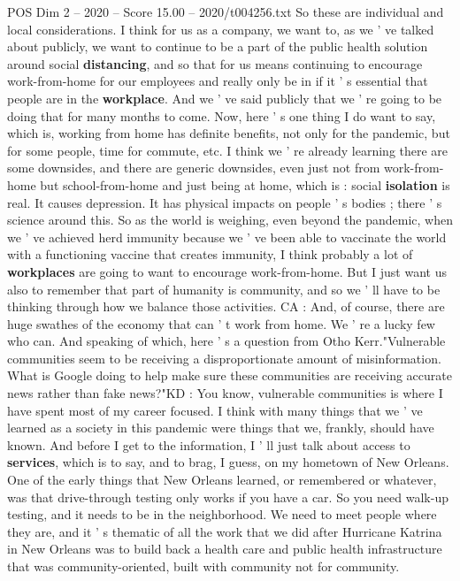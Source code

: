 \begin{textsample}{POS Dim 2 – 2020 – Score 15.00 – 2020/t004256.txt}
So these are individual and local considerations.
I think for us as a company, we want to, as we ' ve talked about publicly, we want to continue to be a part of the public health solution around social \textbf{distancing}, and so that for us means continuing to encourage work-from-home for our employees and really only be in if it ' s essential that people are in the \textbf{workplace}.
And we ' ve said publicly that we ' re going to be doing that for many months to come.
Now, here ' s one thing I do want to say, which is, working from home has definite benefits, not only for the pandemic, but for some people, time for commute, etc.
I think we ' re already learning there are some downsides, and there are generic downsides, even just not from work-from-home but school-from-home and just being at home, which is : social \textbf{isolation} is real.
It causes depression.
It has physical impacts on people ' s bodies ; there ' s science around this.
So as the world is weighing, even beyond the pandemic, when we ' ve achieved herd immunity because we ' ve been able to vaccinate the world with a functioning vaccine that creates immunity, I think probably a lot of \textbf{workplaces} are going to want to encourage work-from-home.
But I just want us also to remember that part of humanity is community, and so we ' ll have to be thinking through how we balance those activities.
CA : And, of course, there are huge swathes of the economy that can ' t work from home.
We ' re a lucky few who can.
And speaking of which, here ' s a question from Otho Kerr."Vulnerable communities seem to be receiving a disproportionate amount of misinformation.
What is Google doing to help make sure these communities are receiving accurate news rather than fake news?"KD : You know, vulnerable communities is where I have spent most of my career focused.
I think with many things that we ' ve learned as a society in this pandemic were things that we, frankly, should have known.
And before I get to the information, I ' ll just talk about access to \textbf{services}, which is to say, and to brag, I guess, on my hometown of New Orleans.
One of the early things that New Orleans learned, or remembered or whatever, was that drive-through testing only works if you have a car.
So you need walk-up testing, and it needs to be in the neighborhood.
We need to meet people where they are, and it ' s thematic of all the work that we did after Hurricane Katrina in New Orleans was to build back a health care and public health infrastructure that was community-oriented, built with community not for community.

\end{textsample}
